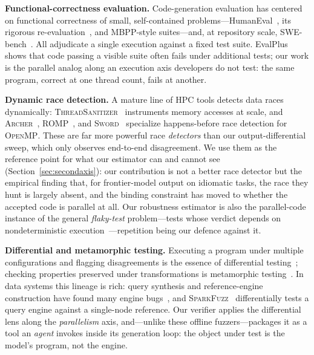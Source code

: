 \vspace{4pt}
\noindent\textbf{Functional-correctness evaluation.}
Code-generation evaluation has centered on functional correctness of small,
self-contained problems---HumanEval~\cite{codex}, its rigorous
re-evaluation~\cite{humaneval_reliability}, and MBPP-style suites---and,
at repository scale, SWE-bench~\cite{swebench}. All adjudicate a single execution
against a fixed test suite. EvalPlus~\cite{humaneval_reliability} shows that code
passing a visible suite often fails under additional tests; our work is the
parallel analog along an execution axis developers do not test: the same program,
correct at one thread count, fails at another.

\vspace{4pt}
\noindent\textbf{Dynamic race detection.}
A mature line of HPC tools detects data races dynamically:
\textsc{ThreadSanitizer}~\cite{tsan} instruments memory accesses at scale, and
\textsc{Archer}~\cite{archer}, \textsc{ROMP}~\cite{romp}, and
\textsc{Sword}~\cite{sword} specialize happens-before race detection for
\textsc{OpenMP}. These are far more powerful race \emph{detectors} than our
output-differential sweep, which only observes end-to-end disagreement. We use them
as the reference point for what our estimator can and cannot see
(Section~\ref{sec:secondaxis}): our contribution is not a better race detector but
the empirical finding that, for frontier-model output on idiomatic tasks, the race
they hunt is largely absent, and the binding constraint has moved to whether the
accepted code is parallel at all. Our robustness estimator is also the
parallel-code instance of the general \emph{flaky-test} problem---tests whose
verdict depends on nondeterministic execution~\cite{flakytests}---repetition being
our defence against it.

\vspace{4pt}
\noindent\textbf{Differential and metamorphic testing.}
Executing a program under multiple configurations and flagging disagreements is
the essence of differential testing~\cite{mckeeman}; checking properties
preserved under transformations is metamorphic testing~\cite{metamorphic}. In
data systems this lineage is rich: query synthesis and reference-engine
construction have found many engine bugs~\cite{rigger2020pqs,rigger2020norec}, and
\textsc{SparkFuzz}~\cite{sparkfuzz} differentially tests a query engine against a
single-node reference. Our verifier applies the differential lens along the
\emph{parallelism} axis, and---unlike these offline fuzzers---packages it as a
tool an \emph{agent} invokes inside its generation loop: the object under test is
the model's program, not the engine.

